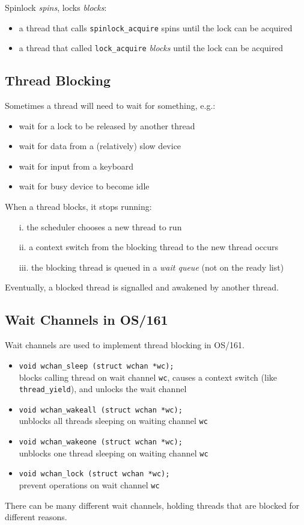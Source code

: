 \documentclass[12pt]{article}
\theoremstyle{plain}
\theoremstyle{definition}
\begin{document}
Spinlock \emph{spins}, locks \emph{blocks}:
\begin{itemize}
  \item a thread that calls \texttt{spinlock\_acquire} spins until the lock can be acquired
  \item a thread that called \texttt{lock\_acquire} \emph{blocks} until the lock can be acquired
\end{itemize}

\subsection{Thread Blocking}
Sometimes a thread will need to wait for something, e.g.:
\begin{itemize}
  \item wait for a lock to be released by another thread
  \item wait for data from a (relatively) slow device
  \item wait for input from a keyboard
  \item wait for busy device to become idle
\end{itemize}

When a thread blocks, it stops running:
\begin{enumerate}
  \item[i.] the scheduler chooses a new thread to run
  \item[ii.] a context switch from the blocking thread to the new thread occurs
  \item[iii.] the blocking thread is queued in a \emph{wait queue} (not on the ready list)
\end{enumerate}

Eventually, a blocked thread is signalled and awakened by another thread.

\subsection{Wait Channels in OS/161}
Wait channels are used to implement thread blocking in OS/161.
\begin{itemize}
  \item \texttt{void wchan\_sleep (struct wchan *wc);} \\
  blocks calling thread on wait channel \texttt{wc}, causes a context switch (like \texttt{thread\_yield}), and unlocks the wait channel
  \item \texttt{void wchan\_wakeall (struct wchan *wc);} \\
  unblocks all threads sleeping on waiting channel \texttt{wc}
  \item \texttt{void wchan\_wakeone (struct wchan *wc);} \\
  unblocks one thread sleeping on waiting channel \texttt{wc}
  \item \texttt{void wchan\_lock (struct wchan *wc);} \\
  prevent operations on wait channel \texttt{wc}
\end{itemize}
There can be many different wait channels, holding threads that are blocked for different reasons. \\
\end{document}
